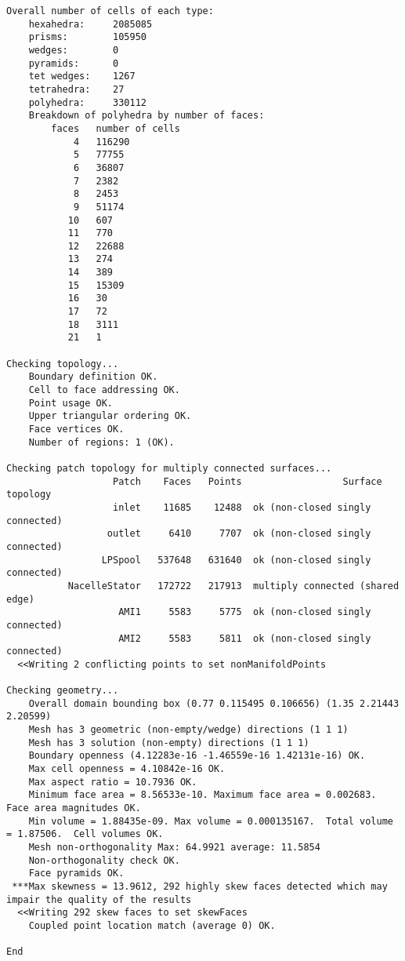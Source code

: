 \begin{footnotesize}
\begin{verbatim}
Overall number of cells of each type:
    hexahedra:     2085085
    prisms:        105950
    wedges:        0
    pyramids:      0
    tet wedges:    1267
    tetrahedra:    27
    polyhedra:     330112
    Breakdown of polyhedra by number of faces:
        faces   number of cells
            4   116290
            5   77755
            6   36807
            7   2382
            8   2453
            9   51174
           10   607
           11   770
           12   22688
           13   274
           14   389
           15   15309
           16   30
           17   72
           18   3111
           21   1

Checking topology...
    Boundary definition OK.
    Cell to face addressing OK.
    Point usage OK.
    Upper triangular ordering OK.
    Face vertices OK.
    Number of regions: 1 (OK).

Checking patch topology for multiply connected surfaces...
                   Patch    Faces   Points                  Surface topology
                   inlet    11685    12488  ok (non-closed singly connected)
                  outlet     6410     7707  ok (non-closed singly connected)
                 LPSpool   537648   631640  ok (non-closed singly connected)
           NacelleStator   172722   217913  multiply connected (shared edge)
                    AMI1     5583     5775  ok (non-closed singly connected)
                    AMI2     5583     5811  ok (non-closed singly connected)
  <<Writing 2 conflicting points to set nonManifoldPoints

Checking geometry...
    Overall domain bounding box (0.77 0.115495 0.106656) (1.35 2.21443 2.20599)
    Mesh has 3 geometric (non-empty/wedge) directions (1 1 1)
    Mesh has 3 solution (non-empty) directions (1 1 1)
    Boundary openness (4.12283e-16 -1.46559e-16 1.42131e-16) OK.
    Max cell openness = 4.10842e-16 OK.
    Max aspect ratio = 10.7936 OK.
    Minimum face area = 8.56533e-10. Maximum face area = 0.002683.  Face area magnitudes OK.
    Min volume = 1.88435e-09. Max volume = 0.000135167.  Total volume = 1.87506.  Cell volumes OK.
    Mesh non-orthogonality Max: 64.9921 average: 11.5854
    Non-orthogonality check OK.
    Face pyramids OK.
 ***Max skewness = 13.9612, 292 highly skew faces detected which may impair the quality of the results
  <<Writing 292 skew faces to set skewFaces
    Coupled point location match (average 0) OK.

End
\end{verbatim}
\end{footnotesize}
